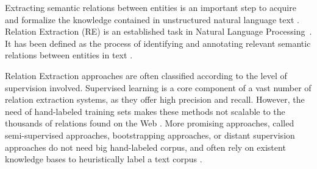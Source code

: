 
Extracting semantic relations between entities is an important step to acquire and formalize the knowledge contained in unstructured natural language text \citep{Wang2008}. 
Relation Extraction (RE) is an established task in Natural Language Processing~\citep{Bach2007}. It has been defined as the process of identifying and annotating relevant semantic relations between entities in text \citep{JiangZhai2007}. 

Relation Extraction approaches are often classified according to the level of supervision involved.
Supervised learning is a core component of a vast number of relation extraction systems, as they offer high precision and recall. However, the need of hand-labeled training sets makes these methods not scalable to the thousands of relations found on the Web \citep{Hoffmann2011}.
More promising approaches, called semi-supervised approaches, bootstrapping approaches, or distant supervision approaches do not need big hand-labeled corpus, and
often rely on existent knowledge bases to heuristically label a text corpus \citep{Carlson2010,Hoffmann2011}.

